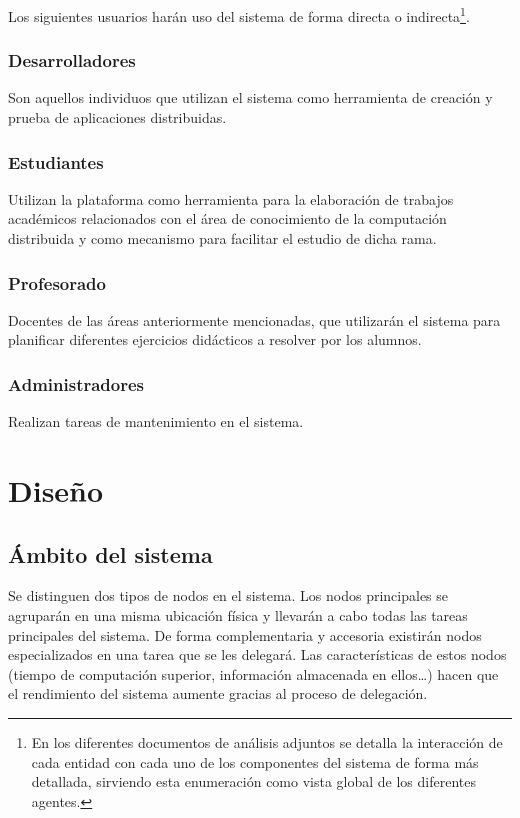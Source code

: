 Los siguientes usuarios harán uso del sistema de forma directa o indirecta\footnote{En los diferentes documentos de análisis adjuntos se detalla la interacción de cada entidad con cada uno de los componentes del sistema de forma más detallada, sirviendo esta enumeración como vista global de los diferentes agentes.}.

\subsubsection{Desarrolladores}

Son aquellos individuos que utilizan el sistema como herramienta de creación y prueba de aplicaciones distribuidas.

\subsubsection{Estudiantes}

Utilizan la plataforma como herramienta para la elaboración de trabajos académicos relacionados con el área de conocimiento de la computación distribuida y como mecanismo para facilitar el estudio de dicha rama.

\subsubsection{Profesorado}

Docentes de las áreas anteriormente mencionadas, que utilizarán el sistema para planificar diferentes ejercicios didácticos a resolver por los alumnos.

\subsubsection{Administradores}

Realizan tareas de mantenimiento en el sistema.

\section{Diseño}

\subsection{Ámbito del sistema}

Se distinguen dos tipos de nodos en el sistema. Los nodos principales se agruparán en una misma ubicación física y llevarán a cabo todas las tareas principales del sistema. De forma complementaria y accesoria existirán nodos especializados en una tarea que se les delegará. Las características de estos nodos (tiempo de computación superior, información almacenada en ellos\dots) hacen que el rendimiento del sistema aumente gracias al proceso de delegación.

